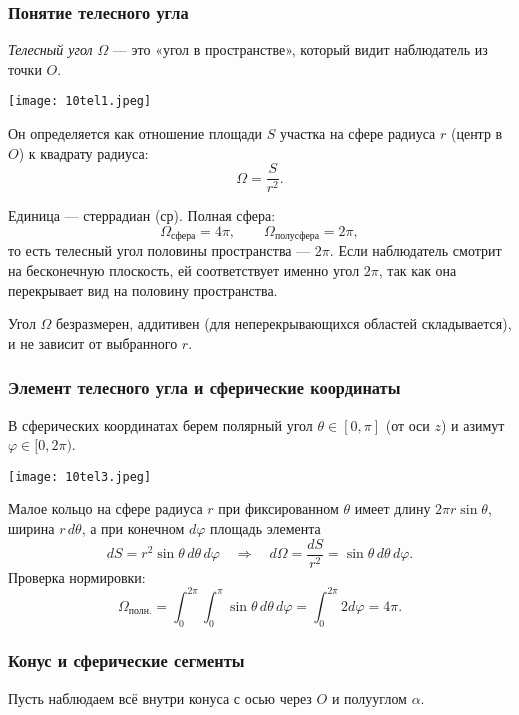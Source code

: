 \documentclass[12pt, a4paper]{article}%
\begin{document}
\subsubsection*{Понятие телесного угла}
\textit{Телесный угол} $\Omega$ — это «угол в пространстве», который видит наблюдатель из точки $O$.

\begin{center}
\texttt{[image: 10tel1.jpeg]}
\label{fig:mpr}
\end{center}

Он определяется как отношение площади $S$ участка на сфере радиуса $r$ (центр в $O$) к квадрату радиуса:
\[
\Omega=\frac{S}{r^2}.
\]

Единица — стеррадиан (ср). Полная сфера:
\[
\Omega_{\text{сфера}}=4\pi,\qquad \Omega_{\text{полусфера}}=2\pi,
\]
то есть телесный угол половины пространства --- $2\pi$. Если наблюдатель смотрит на бесконечную плоскость, ей соответствует именно угол $2\pi$, так как она перекрывает вид на половину пространства.

Угол $\Omega$ безразмерен, аддитивен (для неперекрывающихся областей складывается), и не зависит от выбранного $r$.

\subsubsection*{Элемент телесного угла и сферические координаты}
В сферических координатах берем полярный угол $\theta\in[0,\pi]$ (от оси $z$) и азимут $\varphi\in[0,2\pi)$. 

\begin{center}
\texttt{[image: 10tel3.jpeg]}
\label{fig:mpr}
\end{center}

Малое кольцо на сфере радиуса $r$ при фиксированном $\theta$ имеет длину $2\pi r\sin\theta$, ширина $r\,d\theta$, а при конечном $d\varphi$ площадь элемента
\[
dS=r^2\sin\theta\,d\theta\,d\varphi \quad\Longrightarrow\quad d\Omega=\frac{dS}{r^2}=\sin\theta\,d\theta\,d\varphi.
\]
Проверка нормировки:
\[
\Omega_\text{полн.} = \int_{0}^{2\pi}\!\!\int_{0}^{\pi}\sin\theta\,d\theta\,d\varphi = \int_{0}^{2\pi}2d\varphi=4\pi.
\]

\subsubsection*{Конус и сферические сегменты}
Пусть наблюдаем всё внутри конуса с осью через $O$ и полууглом $\alpha$. 
\end{document}

